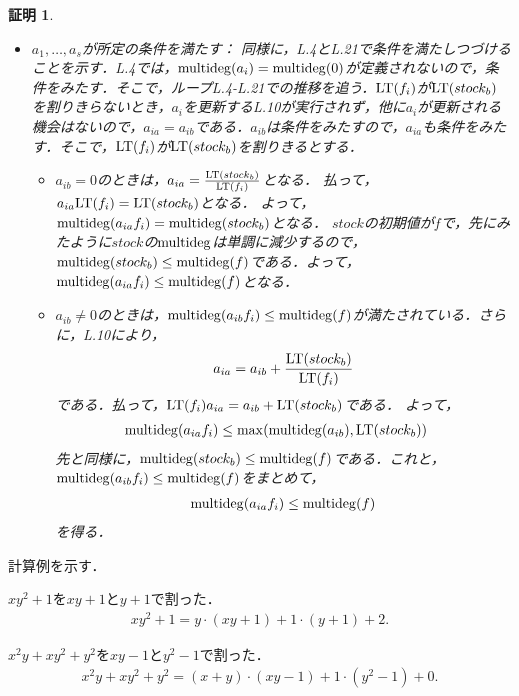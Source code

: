 \documentclass[9pt]{ltjsarticle}
\theoremstyle{break}
\theoremstyle{break}
\theoremstyle{break}
\theoremstyle{break}
\theoremstyle{break}
\theoremstyle{break}
\theoremstyle{break}
\theoremstyle{break}
\theoremstyle{break}
\theoremstyle{break}
\theoremstyle{break}
\theoremstyle{break}
\theoremstyle{break}
\theoremstyle{break}
\theoremstyle{break}
\theoremstyle{nonumberbreak}
\newtheorem{myproof}{証明}
\theoremstyle{nonumberbreak}
\begin{document}
\begin{myproof}
\begin{itemize}
よって，常に$r$のすべての項は$\LT(f_1),\dots,\LT(f_s)$で割りきれないという条件を満たす．
  \item $a_1,\dots,a_s$が所定の条件を満たす：
同様に，L.4とL.21で条件を満たしつづけることを示す．L.4では，$\mathrm{multideg}(a_i)=\mathrm{multideg}(0)$が定義されないので，条件をみたす．そこで，ループL.4-L.21での推移を追う．${\rm LT}(f_i)$が${\rm LT}(stock_b)$を割りきらないとき，$a_i$を更新するL.10が実行されず，他に$a_i$が更新される機会はないので，$a_{ia}=a_{ib}$である．$a_{ib}$は条件をみたすので，$a_{ia}$も条件をみたす．そこで，${\rm LT}(f_i)$が${\rm LT}(stock_b)$を割りきるとする．
\begin{itemize}
 \item
$a_{ib}=0$のときは，$a_{ia}=\frac{{\rm LT}(stock_b)}{{\rm LT}(f_i)}$となる．
払って，$a_{ia}{\rm LT}(f_i) = {\rm LT}(stock_b)$となる．
よって，$\mathrm{multideg}(a_{ia} f_i)=\mathrm{multideg}(stock_b)$となる．
$stock$の初期値が$f$で，先にみたように$stock$の$\mathrm{multideg}$は単調に減少するので，
$\mathrm{multideg}(stock_b) \le \mathrm{multideg}(f)$である．よって，$\mathrm{multideg}(a_{ia}f_i) \le \mathrm{multideg}(f)$となる．
 \item $a_{ib}\neq 0$のときは，$\mathrm{multideg}(a_{ib}f_i)\le \mathrm{multideg}(f)$が満たされている．さらに，L.10により，
\begin{align}
 a_{ia} = a_{ib} + \frac{{\rm LT}(stock_b)}{{\rm LT}(f_i)}
\end{align}
である．払って，${\rm LT}(f_i)a_{ia} = a_{ib} + {\rm LT}(stock_b)$である．
よって，
\begin{align}
 \mathrm{multideg}(a_{ia} f_i)
&\le \max(\mathrm{multideg}(a_{ib}),{\rm LT}(stock_b))
\end{align}
先と同様に，$\mathrm{multideg}(stock_b)\le \mathrm{multideg}(f)$である．これと，$\mathrm{multideg}(a_{ib}f_i)\le \mathrm{multideg}(f)$をまとめて，
\begin{align}
 \mathrm{multideg}(a_{ia}f_i) \le \mathrm{multideg}(f)
\end{align}
を得る．
\end{itemize}
 \end{itemize}
\end{myproof}

計算例を示す．



$xy^2+1$を$xy+1$と$y+1$で割った．
\begin{align}
 xy^2 +1 = y\cdot (xy+1) + 1\cdot (y+1) + 2.
\end{align}


$x^2y+xy^2 + y^2$を$xy-1$と$y^2-1$で割った．
\begin{align}
 x^2y + xy^2 + y^2 = (x+y)\cdot (xy-1) + 1\cdot (y^2-1) + 0.
\end{align}
\end{document}
